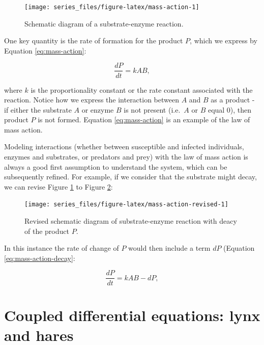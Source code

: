 \documentclass[
]{krantz}
\theoremstyle{definition}
\theoremstyle{definition}
\theoremstyle{definition}
\theoremstyle{definition}
\theoremstyle{remark}
\begin{document}
\begin{figure}

{\centering \texttt{[image: series\_files/figure-latex/mass-action-1]} 

}

\caption{Schematic diagram of a substrate-enzyme reaction.}\label{fig:mass-action}
\end{figure}

One key quantity is the rate of formation for the product \(P\), which we express by Equation \eqref{eq:mass-action}:

\begin{equation}
\frac{dP}{dt}= kAB, \label{eq:mass-action}
\end{equation}

where \(k\) is the proportionality constant or the rate constant associated with the reaction. Notice how we express the interaction between \(A\) and \(B\) as a product - if either the substrate \(A\) or enzyme \(B\) is not present (i.e.~\(A\) or \(B\) equal 0), then product \(P\) is not formed. Equation \eqref{eq:mass-action} is an example of the law of mass action.

Modeling interactions (whether between susceptible and infected individuals, enzymes and substrates, or predators and prey) with the law of mass action is always a good first assumption to understand the system, which can be subsequently refined. For example, if we consider that the substrate might decay, we can revise Figure \ref{fig:mass-action} to Figure \ref{fig:mass-action-revised}:

\begin{figure}

{\centering \texttt{[image: series\_files/figure-latex/mass-action-revised-1]} 

}

\caption{Revised schematic diagram of substrate-enzyme reaction with deacy of the product $P$.}\label{fig:mass-action-revised}
\end{figure}

In this instance the rate of change of \(P\) would then include a term \(dP\) (Equation \eqref{eq:mass-action-decay}:

\begin{equation}
\frac{dP}{dt}= kAB - dP, \label{eq:mass-action-decay}
\end{equation}

\hypertarget{coupled-differential-equations-lynx-and-hares}{%
\section{Coupled differential equations: lynx and hares}\label{coupled-differential-equations-lynx-and-hares}}
\end{document}
